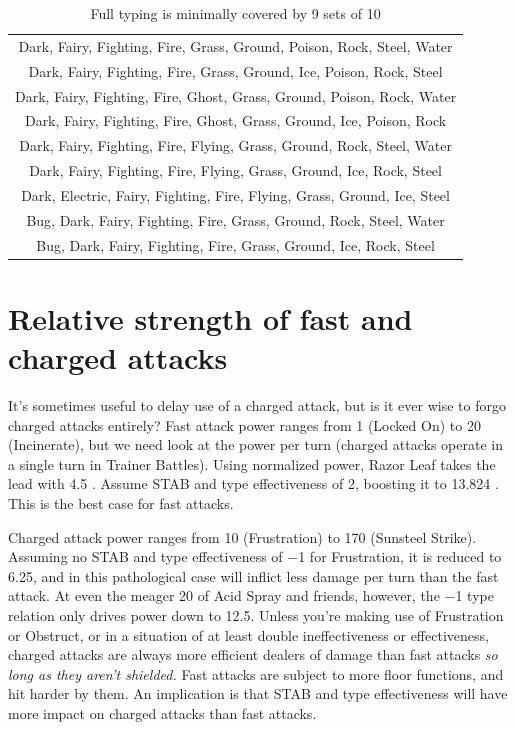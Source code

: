 \begin{table}[hb]
  \centering
  \begin{tabular}{c}
 Dark, Fairy, Fighting, Fire, Grass, Ground, Poison, Rock, Steel, Water\\
 Dark, Fairy, Fighting, Fire, Grass, Ground, Ice, Poison, Rock, Steel\\
 Dark, Fairy, Fighting, Fire, Ghost, Grass, Ground, Poison, Rock, Water\\
 Dark, Fairy, Fighting, Fire, Ghost, Grass, Ground, Ice, Poison, Rock\\
 Dark, Fairy, Fighting, Fire, Flying, Grass, Ground, Rock, Steel, Water\\
 Dark, Fairy, Fighting, Fire, Flying, Grass, Ground, Ice, Rock, Steel\\
 Dark, Electric, Fairy, Fighting, Fire, Flying, Grass, Ground, Ice, Steel\\
 Bug, Dark, Fairy, Fighting, Fire, Grass, Ground, Rock, Steel, Water\\
 Bug, Dark, Fairy, Fighting, Fire, Grass, Ground, Ice, Rock, Steel\\
  \end{tabular}
  \caption{Full typing is minimally covered by 9 sets of 10\label{table:coversetsdual}}
\end{table}

\section{Relative strength of fast and charged attacks\label{sec:fastvcharged}}
It's sometimes useful to delay use of a charged attack, but is it ever wise to forgo
  charged attacks entirely?
Fast attack power ranges from 1 (Locked On) to 20 (Incinerate), but we need look at
  the power per turn (charged attacks operate in a single turn in Trainer Battles).
Using normalized power, Razor Leaf takes the lead with 4.5 \PPT{}\@.
Assume STAB and type effectiveness of 2, boosting it to 13.824 \PPT{}\@.
This is the best case for fast attacks.

Charged attack power ranges from 10 (Frustration) to 170 (Sunsteel Strike).
Assuming no STAB and type effectiveness of −1 for Frustration, it is reduced to 6.25,
  and in this pathological case will inflict less damage per turn than the fast attack.
At even the meager 20 of Acid Spray and friends, however, the −1 type relation only
  drives power down to 12.5.
Unless you're making use of Frustration or Obstruct,
  or in a situation of at least double ineffectiveness or effectiveness,
  charged attacks are always more efficient dealers of damage than fast attacks \textit{so long
  as they aren't shielded.}
Fast attacks are subject to more floor functions, and hit harder by them.
An implication is that STAB and type effectiveness will have more impact on
 charged attacks than fast attacks.

